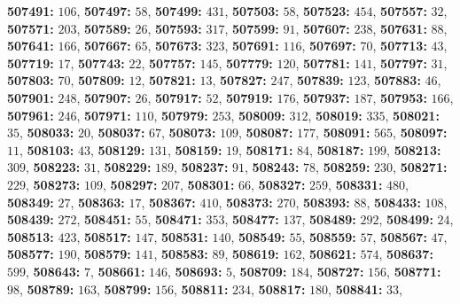 \textsf{\bfseries 507491:} $106$, \textsf{\bfseries 507497:} $58$, \textsf{\bfseries 507499:} $431$, \textsf{\bfseries 507503:} $58$, \textsf{\bfseries 507523:} $454$, \textsf{\bfseries 507557:} $32$, \textsf{\bfseries 507571:} $203$, \textsf{\bfseries 507589:} $26$, \textsf{\bfseries 507593:} $317$, \textsf{\bfseries 507599:} $91$, \textsf{\bfseries 507607:} $238$, \textsf{\bfseries 507631:} $88$, \textsf{\bfseries 507641:} $166$, \textsf{\bfseries 507667:} $65$, \textsf{\bfseries 507673:} $323$, \textsf{\bfseries 507691:} $116$, \textsf{\bfseries 507697:} $70$, \textsf{\bfseries 507713:} $43$, \textsf{\bfseries 507719:} $17$, \textsf{\bfseries 507743:} $22$, \textsf{\bfseries 507757:} $145$, \textsf{\bfseries 507779:} $120$, \textsf{\bfseries 507781:} $141$, \textsf{\bfseries 507797:} $31$, \textsf{\bfseries 507803:} $70$, \textsf{\bfseries 507809:} $12$, \textsf{\bfseries 507821:} $13$, \textsf{\bfseries 507827:} $247$, \textsf{\bfseries 507839:} $123$, \textsf{\bfseries 507883:} $46$, \textsf{\bfseries 507901:} $248$, \textsf{\bfseries 507907:} $26$, \textsf{\bfseries 507917:} $52$, \textsf{\bfseries 507919:} $176$, \textsf{\bfseries 507937:} $187$, \textsf{\bfseries 507953:} $166$, \textsf{\bfseries 507961:} $246$, \textsf{\bfseries 507971:} $110$, \textsf{\bfseries 507979:} $253$, \textsf{\bfseries 508009:} $312$, \textsf{\bfseries 508019:} $335$, \textsf{\bfseries 508021:} $35$, \textsf{\bfseries 508033:} $20$, \textsf{\bfseries 508037:} $67$, \textsf{\bfseries 508073:} $109$, \textsf{\bfseries 508087:} $177$, \textsf{\bfseries 508091:} $565$, \textsf{\bfseries 508097:} $11$, \textsf{\bfseries 508103:} $43$, \textsf{\bfseries 508129:} $131$, \textsf{\bfseries 508159:} $19$, \textsf{\bfseries 508171:} $84$, \textsf{\bfseries 508187:} $199$, \textsf{\bfseries 508213:} $309$, \textsf{\bfseries 508223:} $31$, \textsf{\bfseries 508229:} $189$, \textsf{\bfseries 508237:} $91$, \textsf{\bfseries 508243:} $78$, \textsf{\bfseries 508259:} $230$, \textsf{\bfseries 508271:} $229$, \textsf{\bfseries 508273:} $109$, \textsf{\bfseries 508297:} $207$, \textsf{\bfseries 508301:} $66$, \textsf{\bfseries 508327:} $259$, \textsf{\bfseries 508331:} $480$, \textsf{\bfseries 508349:} $27$, \textsf{\bfseries 508363:} $17$, \textsf{\bfseries 508367:} $410$, \textsf{\bfseries 508373:} $270$, \textsf{\bfseries 508393:} $88$, \textsf{\bfseries 508433:} $108$, \textsf{\bfseries 508439:} $272$, \textsf{\bfseries 508451:} $55$, \textsf{\bfseries 508471:} $353$, \textsf{\bfseries 508477:} $137$, \textsf{\bfseries 508489:} $292$, \textsf{\bfseries 508499:} $24$, \textsf{\bfseries 508513:} $423$, \textsf{\bfseries 508517:} $147$, \textsf{\bfseries 508531:} $140$, \textsf{\bfseries 508549:} $55$, \textsf{\bfseries 508559:} $57$, \textsf{\bfseries 508567:} $47$, \textsf{\bfseries 508577:} $190$, \textsf{\bfseries 508579:} $141$, \textsf{\bfseries 508583:} $89$, \textsf{\bfseries 508619:} $162$, \textsf{\bfseries 508621:} $574$, \textsf{\bfseries 508637:} $599$, \textsf{\bfseries 508643:} $7$, \textsf{\bfseries 508661:} $146$, \textsf{\bfseries 508693:} $5$, \textsf{\bfseries 508709:} $184$, \textsf{\bfseries 508727:} $156$, \textsf{\bfseries 508771:} $98$, \textsf{\bfseries 508789:} $163$, \textsf{\bfseries 508799:} $156$, \textsf{\bfseries 508811:} $234$, \textsf{\bfseries 508817:} $180$, \textsf{\bfseries 508841:} $33$, 
